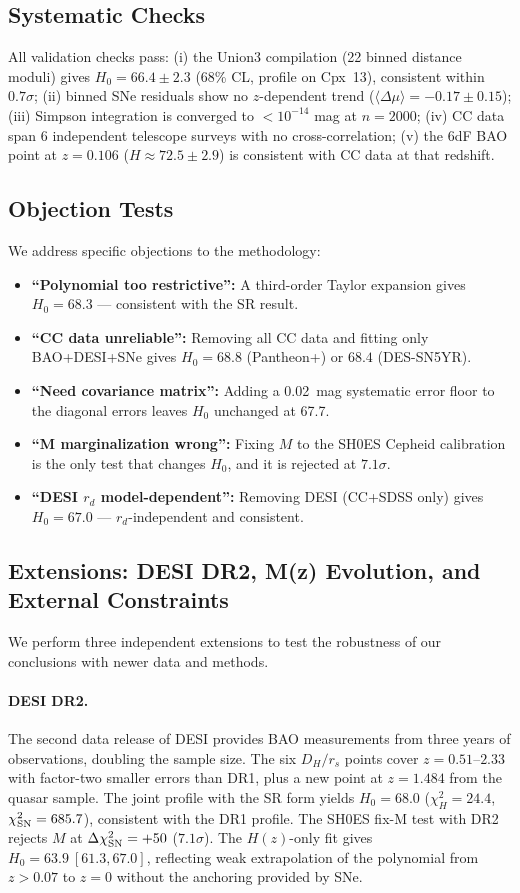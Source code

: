 \documentclass[twocolumn]{aastex631}
\begin{document}
\subsection{Systematic Checks}
All validation checks pass: (i) the Union3 compilation (22 binned distance
moduli) gives $H_0=66.4\pm2.3$ (68\% CL, profile on Cpx~13), consistent
within $0.7\sigma$; (ii) binned SNe residuals show no $z$-dependent
trend ($\langle\Delta\mu\rangle = -0.17 \pm 0.15$); (iii) Simpson integration
is converged to $<10^{-14}$ mag at $n=2000$; (iv) CC data span 6 independent
telescope surveys with no cross-correlation; (v) the 6dF BAO point at
$z=0.106$ ($H\approx72.5\pm2.9$) is consistent with CC data at that
redshift.

\subsection{Objection Tests}
We address specific objections to the methodology:
\begin{itemize}
\item \textbf{``Polynomial too restrictive'':} A third-order Taylor expansion
gives $H_0=68.3$ --- consistent with the SR result.
\item \textbf{``CC data unreliable'':} Removing all CC data and fitting only
BAO+DESI+SNe gives $H_0=68.8$ (Pantheon+) or $68.4$ (DES-SN5YR).
\item \textbf{``Need covariance matrix'':} Adding a 0.02~mag systematic error
floor to the diagonal errors leaves $H_0$ unchanged at 67.7.
\item \textbf{``M marginalization wrong'':} Fixing $M$ to the SH0ES Cepheid
calibration is the only test that changes $H_0$, and it is rejected at $7.1\sigma$.
\item \textbf{``DESI $r_d$ model-dependent'':} Removing DESI (CC+SDSS only)
gives $H_0=67.0$ --- $r_d$-independent and consistent.
\end{itemize}

\subsection{Extensions: DESI DR2, M(z) Evolution, and External Constraints}

We perform three independent extensions to test the robustness of our
conclusions with newer data and methods.

\paragraph{DESI DR2.}
The second data release of DESI \cite{desi_dr2} provides BAO measurements
from three years of observations, doubling the sample size.  The six $D_H/r_s$
points cover $z=0.51$--$2.33$ with factor-two smaller errors than DR1, plus
a new point at $z=1.484$ from the quasar sample.  The joint profile with the SR
form yields $H_0=68.0$ ($\chi^2_H=24.4$, $\chi^2_{\rm SN}=685.7$), consistent
with the DR1 profile. The SH0ES fix-M test with DR2 rejects $M$ at
$\Delta\chi^2_{\rm SN}=+50$ ($7.1\sigma$).  The $H(z)$-only fit gives
$H_0=63.9\ [61.3, 67.0]$, reflecting weak extrapolation of the polynomial
from $z>0.07$ to $z=0$ without the anchoring provided by SNe.
\end{document}

